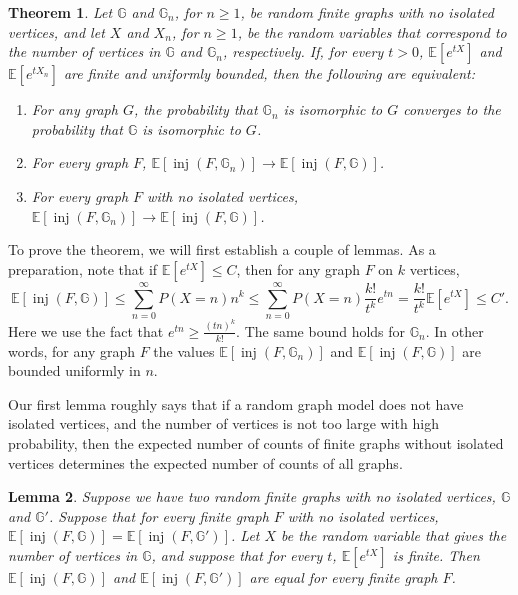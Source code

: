 \documentclass{amsart}
\numberwithin{equation}{section}
\numberwithin{figure}{section}
\newtheorem{theorem}{Theorem}[section]
\newtheorem{lemma}[theorem]{Lemma}
\theoremstyle{definition}
\theoremstyle{remark}
\DeclareMathOperator{\inj}{inj}
\newcommand{\EE}{\mathbb{E}}
\begin{document}
\begin{theorem} \label{theoremconveq}
Let $\mathbb{G}$ and $\mathbb{G}_n$, for $n\geq 1$, be random finite graphs
with no isolated vertices, and let $X$ and $X_n$, for $n\geq 1$, be the
random variables that correspond to the number of vertices in $\mathbb{G}$
and $\mathbb{G}_n$, respectively. If, for every $t>0$, $\EE[e^{t X}]$ and
$\EE[e^{t X_n}]$ are finite and uniformly bounded, then the following are
equivalent:
\begin{enumerate}
\item For any graph $G$, the probability that $\mathbb{G}_n$ is isomorphic
    to $G$ converges to the probability that $\mathbb{G}$ is isomorphic to
$G$. \label{convdist}
\item For every graph $F$, $\EE[\inj(F,\mathbb{G}_n)] \rightarrow
    \EE[\inj(F,\mathbb{G})]$. \label{convexpinjany}
\item For every graph $F$ with no isolated vertices,
    $\EE[\inj(F,\mathbb{G}_n)] \rightarrow \EE[\inj(F,\mathbb{G})]$.
    \label{convexpinjnoisol}
\end{enumerate}
\end{theorem}

To prove the theorem, we will first establish a couple of lemmas. As a
preparation, note that if $\EE[e^{tX} ]\le C$, then for any graph $F$ on $k$
vertices,
\[\EE[\inj(F,\mathbb{G})] \le \sum_{n=0}^{\infty} P(X=n) n^k
\le
\sum_{n=0}^{\infty} P(X=n)
{\frac{k!}{t^k}} e^{tn}
=
{\frac{k!}{t^k}}\EE[e^{tX}]\leq C'.
\]
Here we use the fact that $e^{tn} \ge \frac{(tn)^k}{k!} $. The same bound
holds for $\mathbb{G}_n$. In other words, for any graph $F$ the values
$\EE[\inj(F,\mathbb{G}_n)]$ and $\EE[\inj(F,\mathbb{G})]$ are bounded
uniformly in $n$.

Our first lemma roughly says that if a random graph model does not have
isolated vertices, and the number of vertices is not too large with high
probability, then the expected number of counts of finite graphs without
isolated vertices determines the expected number of counts of all graphs.

\begin{lemma} \label{lemmanoisolallequal}
Suppose we have two random finite graphs with no isolated vertices,
$\mathbb{G}$ and $\mathbb{G}'$. Suppose that for every finite graph $F$ with
no isolated vertices, $\EE[\inj(F,\mathbb{G})]=\EE[\inj(F,\mathbb{G}')]$. Let
$X$ be the random variable that gives the number of vertices in $\mathbb{G}$,
and suppose that for every $t$, $\EE[e^{tX}]$ is finite. Then
$\EE[\inj(F,\mathbb{G})]$ and $\EE[\inj(F,\mathbb{G}')]$ are equal for
\emph{every} finite graph $F$.
\end{lemma}
\end{document}
